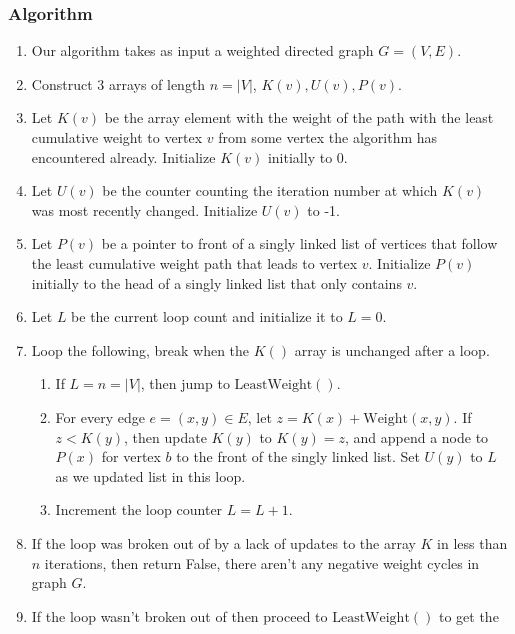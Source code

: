 \documentclass{article}
\begin{document}
\subsubsection{Algorithm}
\begin{enumerate}
      \item Our algorithm takes as input a weighted directed graph \(G = (V, E)\).
      \item Construct 3 arrays of length \(n=|V|\), \(K(v), U(v), P(v)\).
      \item Let \(K(v)\) be the array element with the weight of the path
            with the least cumulative weight to vertex \(v\) from some vertex the algorithm has
            encountered already. Initialize \(K(v)\) initially to 0.
      \item Let \(U(v)\) be the counter counting the iteration number at which \(K(v)\)
            was most recently changed. Initialize \(U(v)\) to -1.
      \item Let \(P(v)\) be a pointer to front of a singly linked list of vertices that
            follow the least cumulative weight path that leads to vertex \(v\). Initialize \(P(v)\)
            initially to the head of a singly linked list that only contains \(v\).
      \item Let \(L\) be the current loop count and initialize it to \(L=0\).
      \item Loop the following, break when the \(K()\) array is unchanged after a loop.
            \begin{enumerate}
                  \item If \(L = n = |V|\), then jump to \(\text{LeastWeight}()\).
                  \item For every edge \(e = (x, y) \in E \), let \(z = K(x) +
                        \text{Weight}(x,y)\). If \(z < K(y)\), then update \(K(y)\) to \(K(y) = z\),
                        and append a node to \(P(x)\) for vertex \(b\) to the front of the singly
                        linked list. Set \(U(y)\) to \(L\) as we updated list in this loop.
                  \item Increment the loop counter \(L = L + 1\).
            \end{enumerate}
      \item If the loop was broken out of by a lack of updates to the array \(K\) in less
            than \(n\) iterations, then return False, there aren't any negative weight cycles in
            graph \(G\).
      \item If the loop wasn't broken out of then proceed to \(\text{LeastWeight}()\) to get the

\end{enumerate}
\end{document}
